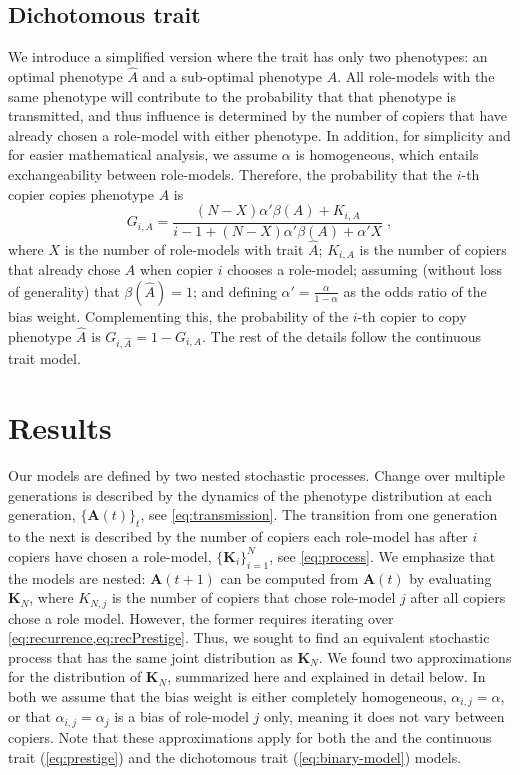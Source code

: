 \documentclass[12pt]{extarticle}
\let\vec\mathbf
\begin{document}
\subsection*{Dichotomous trait}
{We} introduce a simplified version where the trait {has only} two phenotypes: {an} optimal phenotype $\hat{A}$ and {a} sub-optimal phenotype $A$. 
All role-models with the same phenotype will contribute to the probability {that} that phenotype {is} transmitted, and thus influence is determined by the number of copiers that have already chosen a role-model with either phenotype.
In addition, for simplicity and for easier mathematical analysis, we assume $\alpha$ is homogeneous, {which entails} exchangeability between role-models.
Therefore, the probability {that} the $i$-th copier {copies} phenotype $A$ is
\begin{equation}\label{eq:binary-model}
G_{i,A} = \frac{(N-X)\alpha'\beta(A) + K_{i,A}}{i-1 + (N-X)\alpha'\beta(A) + \alpha'X} \;,
\end{equation}
where $X$ is the number of role-models with trait $\hat{A}$; $K_{i,A}$ is the number of copiers that already chose $A$ when copier $i$ chooses a role-model; assuming (without loss of generality) that $\beta(\hat{A})=1$; and defining $\alpha'= \frac{\alpha}{1-\alpha}$ as the odds ratio of the bias weight.
Complementing this, the probability of the $i$-th copier to copy phenotype $\hat{A}$ is $G_{i, \hat{A}} = 1-G_{i,A}$.
The rest of the details follow the continuous trait model.


\section*{Results}
Our models are defined by two nested stochastic processes. Change over multiple generations is described by the {dynamics of the} phenotype distribution at each generation, $\{\vec{A}(t)\}_t$, see \cref{eq:transmission}. The transition from one generation to the next is described by the number of copiers each role-model has after $i$ copiers have chosen a role-model, $\{\vec{K}_i\}_{i=1}^N$, see \cref{eq:process}.
We emphasize that the models are nested: $\vec{A}(t+1)$ can be computed from $\vec{A}(t)$ by evaluating $\vec{K}_{N}$, where $K_{N,j}$ is the number of copiers that chose role-model $j$ after all copiers chose a role model.
However, the former requires iterating over \cref{eq:recurrence,eq:recPrestige}.
Thus, we sought to find an equivalent stochastic process that has the same joint distribution as $\vec{K}_{N}$. 
We found two approximations for the distribution of $\vec{K}_{N}$, summarized here and explained in detail below.
In both we assume that the bias weight is either completely homogeneous, $\alpha_{i,j}=\alpha$, or that $\alpha_{i,j}=\alpha_j$ is a bias of role-model $j$ only, meaning it does not vary between copiers. %
Note that these approximations apply for both the and the continuous trait (\cref{eq:prestige}) and the dichotomous trait (\cref{eq:binary-model}) models.
\end{document}
